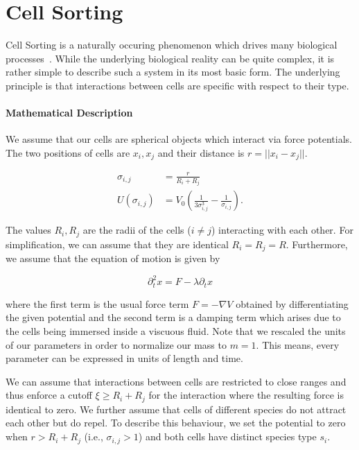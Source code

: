 \documentclass[fontsize=11pt,a4paper]{article}
\begin{document}
\section{Cell Sorting}
\label{sec:cell-sorting}

Cell Sorting is a naturally occuring phenomenon which drives many biological
processes~\cite{Steinberg1963,Graner1992}.
While the underlying biological reality can be quite complex, it is rather simple to describe such
a system in its most basic form.
The underlying principle is that interactions between cells are specific with respect to their type.

\paragraph{Mathematical Description}
We assume that our cells are spherical objects which interact via force potentials.
The two positions of cells are $x_i,x_j$ and their distance is $r=||x_i-x_j||$.

\begin{align}
    \sigma_{i,j} &= \frac{r}{R_i + R_j}\\
    U(\sigma_{i,j}) &= V_0 \left(\frac{1}{3\sigma_{i,j}^3} - \frac{1}{\sigma_{i,j}}\right).
\end{align}

The values $R_i,R_j$ are the radii of the cells ($i\neq j$) interacting with each other.
For simplification, we can assume that they are identical $R_i=R_j=R$.
Furthermore, we assume that the equation of motion is given by

\begin{equation}
    \partial^2_t x = F - \lambda \partial_t x
\end{equation}

where the first term is the usual force term $F = - \nabla V$ obtained by differentiating the given
potential and the second term is a damping term which arises due to the cells being immersed inside
a viscuous fluid.
Note that we rescaled the units of our parameters in order to normalize our mass to $m=1$.
This means, every parameter can be expressed in units of length and time.

We can assume that interactions between cells are restricted to close ranges and thus enforce a
cutoff $\xi\geq R_i+R_j$ for the interaction where the resulting force is identical to zero.
We further assume that cells of different species do not attract each other but do repel.
To describe this behaviour, we set the potential to zero when $r>R_i+R_j$ (i.e., $\sigma_{i,j}>1$)
and both cells have distinct species type $s_i$.
\end{document}
